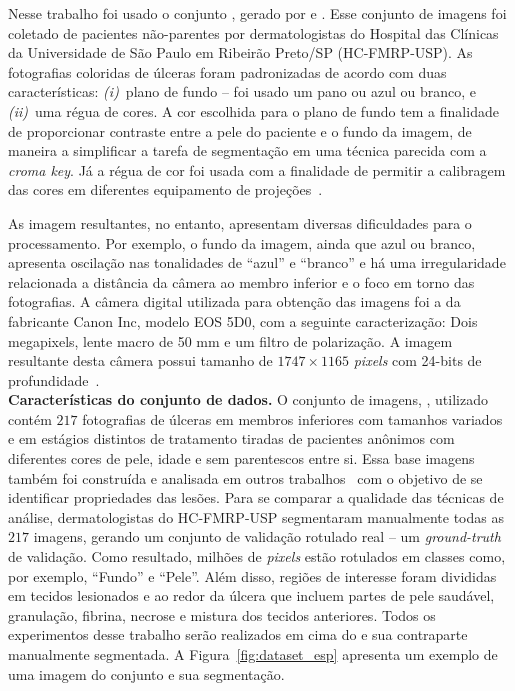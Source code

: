 Nesse trabalho foi usado o conjunto \dataset, gerado por  e .
Esse conjunto de imagens foi coletado de pacientes não-parentes por dermatologistas do Hospital das Clínicas da Universidade de São Paulo em Ribeirão Preto/SP (HC-FMRP-USP).
As fotografias coloridas de úlceras foram padronizadas de acordo com duas características: 
\textit{(i)}~plano de fundo -- foi usado um pano ou azul ou branco, e 
\textit{(ii)}~uma régua de cores.
A cor escolhida para o plano de fundo tem a finalidade de proporcionar contraste entre a pele do paciente e o fundo da imagem, de maneira a simplificar a tarefa de segmentação em uma técnica parecida com a \textit{croma key}.
Já a régua de cor foi usada com a finalidade de permitir a calibragem das cores em diferentes equipamento de projeções~\cite{Pereira2011}.

As imagem resultantes, no entanto, apresentam diversas dificuldades para o processamento.
Por exemplo, o fundo da imagem, ainda que azul ou branco, apresenta oscilação nas tonalidades de ``azul'' e ``branco'' e há uma irregularidade relacionada a distância da câmera ao membro inferior e o foco em torno das fotografias.
A câmera digital utilizada para obtenção das imagens foi a da fabricante Canon Inc, modelo  EOS 5D0, com a seguinte caracterização: Dois megapixels, lente macro de 50 mm e um filtro de polarização. 
A imagem resultante desta câmera possui tamanho de $1747\times1165$ \textit{pixels} com 24-bits de profundidade~\cite{Dorileo2008}.\\

\noindent
\textbf{Características do conjunto de dados.}
O conjunto de imagens, \dataset, utilizado contém $217$ fotografias de úlceras em membros inferiores com tamanhos variados e em estágios distintos de tratamento tiradas de pacientes anônimos com diferentes cores de pele, idade e sem parentescos entre si. 
Essa base imagens também foi construída e analisada em outros trabalhos~\cite{Dorileo2010,Pereira2011} com o objetivo de se identificar propriedades das lesões.
Para se comparar a qualidade das técnicas de análise, dermatologistas do HC-FMRP-USP segmentaram manualmente todas as $217$ imagens, gerando um conjunto de validação rotulado real -- um \textit{ground-truth} de validação.
Como resultado, milhões de \textit{pixels} estão rotulados em classes como, por exemplo, ``Fundo'' e ``Pele''.
Além disso, regiões de interesse foram divididas em tecidos lesionados e ao redor da úlcera que incluem partes de pele saudável, granulação, fibrina, necrose e mistura dos tecidos anteriores.
Todos os experimentos desse trabalho serão realizados em cima do \dataset e sua contraparte manualmente segmentada.
A Figura~\ref{fig:dataset_esp} apresenta um exemplo de uma imagem do conjunto \dataset e sua segmentação.\\

